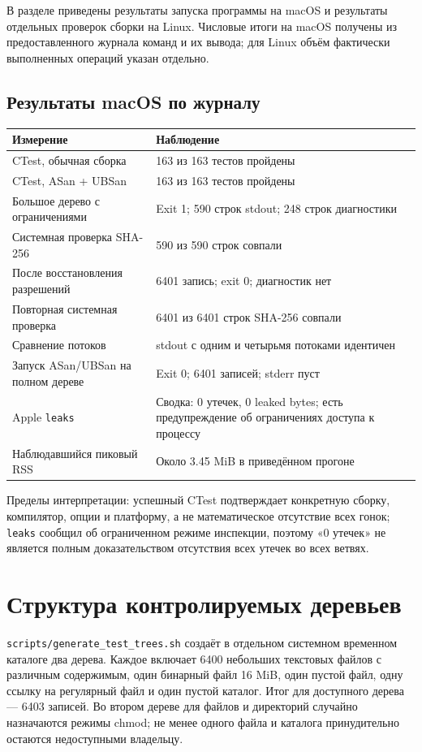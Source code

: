 \documentclass[12pt,a4paper]{article}
\begin{document}
В разделе приведены результаты запуска программы на macOS и результаты
отдельных проверок сборки на Linux. Числовые итоги на macOS получены
из предоставленного журнала команд и их вывода; для Linux объём
фактически выполненных операций указан отдельно.

\subsection{Результаты macOS по журналу}

\begin{longtable}{P{0.48\textwidth}P{0.43\textwidth}}
\toprule
Измерение & Наблюдение \\
\midrule
\endhead
CTest, обычная сборка & 163 из 163 тестов пройдены \\
CTest, ASan + UBSan & 163 из 163 тестов пройдены \\
Большое дерево с ограничениями & Exit 1; 590 строк stdout; 248 строк диагностики \\
Системная проверка SHA-256 & 590 из 590 строк совпали \\
После восстановления разрешений & 6401 запись; exit 0; диагностик нет \\
Повторная системная проверка & 6401 из 6401 строк SHA-256 совпали \\
Сравнение потоков & stdout с одним и четырьмя потоками идентичен \\
Запуск ASan/UBSan на полном дереве & Exit 0; 6401 записей; stderr пуст \\
Apple \texttt{leaks} & Сводка: 0 утечек, 0 leaked bytes; есть предупреждение об ограничениях доступа к процессу \\
Наблюдавшийся пиковый RSS & Около 3.45 MiB в приведённом прогоне \\
\bottomrule
\end{longtable}

Пределы интерпретации: успешный CTest подтверждает конкретную сборку,
компилятор, опции и платформу, а не математическое отсутствие всех гонок;
\texttt{leaks} сообщил об ограниченном режиме инспекции, поэтому «0 утечек»
не является полным доказательством отсутствия всех утечек во всех ветвях.

\section{Структура контролируемых деревьев}

\texttt{scripts/generate\_test\_trees.sh} создаёт в отдельном системном
временном каталоге два дерева. Каждое включает 6400 небольших текстовых
файлов с различным содержимым, один бинарный файл 16 MiB, один пустой файл,
одну ссылку на регулярный файл и один пустой каталог. Итог для доступного
дерева --- 6403 записей. Во втором дереве для файлов и директорий случайно
назначаются режимы chmod; не менее одного файла и каталога принудительно
остаются недоступными владельцу.
\end{document}
